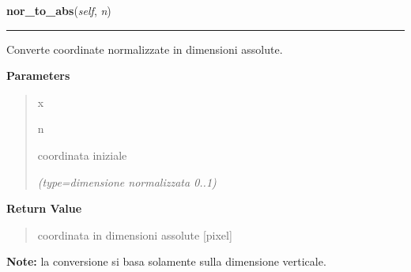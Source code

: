     \label{pla:Pla:nor_to_abs}

    \vspace{0.5ex}

\hspace{.8\funcindent}\begin{boxedminipage}{\funcwidth}

    \raggedright \textbf{nor\_to\_abs}(\textit{self}, \textit{n})

    \vspace{-1.5ex}

    \rule{\textwidth}{0.5\fboxrule}
\setlength{\parskip}{2ex}
    Converte coordinate normalizzate in dimensioni assolute.

\setlength{\parskip}{1ex}
      \textbf{Parameters}
      \vspace{-1ex}

      \begin{quote}
        \begin{Ventry}{x}

          \item[n]

          coordinata iniziale

            {\it (type=dimensione normalizzata 0..1)}

        \end{Ventry}

      \end{quote}

      \textbf{Return Value}
    \vspace{-1ex}

      \begin{quote}
      coordinata in dimensioni assolute [pixel]

      \end{quote}

\textbf{Note:} la conversione si basa solamente sulla dimensione verticale.



    \end{boxedminipage}

    \label{pla:Pla:add_and}

    \vspace{0.5ex}

